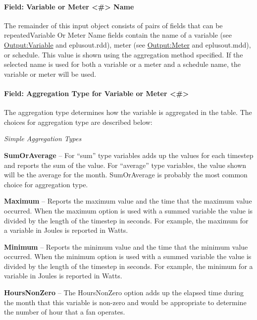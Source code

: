 \paragraph{Field: Variable or Meter \textless{}\#\textgreater{} Name}\label{field-variable-or-meter-name}

The remainder of this input object consists of pairs of fields that can be repeatedVariable Or Meter Name fields contain the name of a variable (see \hyperref[outputvariable]{Output:Variable} and eplusout.rdd), meter (see \hyperref[outputmeter-and-outputmetermeterfileonly]{Output:Meter} and eplusout.mdd), or schedule. This value is shown using the aggregation method specified. If the selected name is used for both a variable or a meter and a schedule name, the variable or meter will be used.

\paragraph{Field: Aggregation Type for Variable or Meter \textless{}\#\textgreater{}}\label{field-aggregation-type-for-variable-or-meter}

The aggregation type determines how the variable is aggregated in the table. The choices for aggregation type are described below:

\emph{Simple Aggregation Types}

\textbf{SumOrAverage} -- For ``sum'' type variables adds up the values for each timestep and reports the sum of the value. For ``average'' type variables, the value shown will be the average for the month. SumOrAverage is probably the most common choice for aggregation type.

\textbf{Maximum} -- Reports the maximum value and the time that the maximum value occurred. When the maximum option is used with a summed variable the value is divided by the length of the timestep in seconds. For example, the maximum for a variable in Joules is reported in Watts.

\textbf{Minimum} -- Reports the minimum value and the time that the minimum value occurred. When the minimum option is used with a summed variable the value is divided by the length of the timestep in seconds. For example, the minimum for a variable in Joules is reported in Watts.

\textbf{HoursNonZero} -- The HoursNonZero option adds up the elapsed time during the month that this variable is non-zero and would be appropriate to determine the number of hour that a fan operates.


